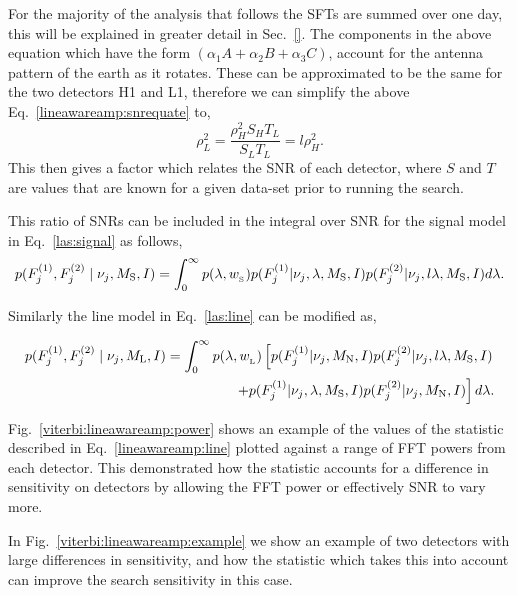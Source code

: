For the majority of the analysis that follows the \acp{SFT} are summed over one day, this will be explained in greater detail in Sec.~\ref{}. The components in the above equation which have the form $(\alpha_1A + \alpha_2B + \alpha_3C)$, account for the antenna pattern of the earth as it rotates. These can be approximated to be the same for the two detectors H1 and L1, therefore we can simplify the above Eq.~\ref{lineawareamp:snrequate} to, 
\begin{equation}
\label{lineawareamp:snrratio}
    \rho_L^2 = \frac{\rho_H^2 S_H T_L}{S_L T_L} = l \rho_H^2 .
\end{equation}
This then gives a factor which relates the \ac{SNR} of each detector, where $S$ and $T$ are values that are known for a given data-set prior to running the search.

This ratio of \acp{SNR} can be included in the integral over \ac{SNR} for the signal model in Eq.~\ref{las:signal} as follows,
\begin{equation}
\label{lineawareamp:signal}
p(F^{(1)}_{j},F^{(2)}_{j} \mid \nu_j,M_{\rm{S}},I) = \int_0^{\infty}  p(\lambda,w_{\rm_S}) 
p(F^{(1)}_{j}|\nu_j,\lambda,M_{\text{S}},I)p(F^{(2)}_{j}|\nu_j,l\lambda,M_{\text{S}},I) d\lambda.
\end{equation}

Similarly the line model in Eq.~\ref{las:line} can be modified as,

\begin{equation}
\label{lineawareamp:line}
\begin{split}
p(F^{(1)}_{j},F^{(2)}_{j} \mid \nu_j,M_{\rm{L}},I) = \int_0^{\infty}  p(\lambda,w_{\rm_L}) 
\left[ p(F^{(1)}_{j}|\nu_j,M_{\rm{N}},I)p(F^{(2)}_{j}|\nu_j,l\lambda,M_{\rm{S}},I) \right. \\
\left. + p(F^{(1)}_{j}|\nu_j,\lambda,M_{\rm{S}},I)p(F^{(2)}_{j}|\nu_j,M_{\rm{N}},I)\right]d\lambda .
\end{split}
\end{equation}

Fig.~\ref{viterbi:lineawareamp:power} shows an example of the values of the statistic described in Eq.~\ref{lineawareamp:line} plotted against a range of \ac{FFT} powers from each detector. This demonstrated how the statistic accounts for a difference in sensitivity on detectors by allowing the \ac{FFT} power or effectively \ac{SNR} to vary more.

In Fig.~\ref{viterbi:lineawareamp:example} we show an example of two detectors with large differences in sensitivity, and how the statistic which takes this into account can improve the search sensitivity in this case.

